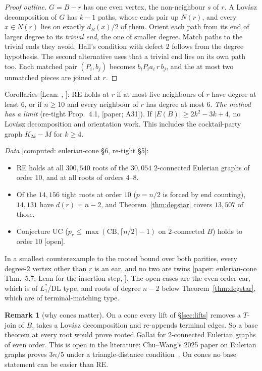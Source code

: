 \documentclass[11pt]{amsart}
\theoremstyle{definition}
\newtheorem{remark}[theorem]{Remark}
\newcommand{\st}[1]{\textsf{\small[#1]}}
\begin{document}
\begin{proof}[Proof outline]
$G=B-r$ has one even vertex, the non-neighbour $s$ of $r$. A Lov\'asz decomposition of $G$ has $k-1$
paths, whose ends pair up $N(r)$, and every $x\in N(r)$ lies on exactly $d_B(x)/2$ of them. Orient each
path from its end of larger degree to its \emph{trivial end}, the one of smaller degree. Match paths to
the trivial ends they avoid. Hall's condition with defect $2$ follows from the degree hypothesis. The
second alternative uses that a trivial end lies on its own path too. Each matched pair $(P_i,b_j)$
becomes $b_iP_ia_i\,r\,b_j$, and the at most two unmatched pieces are joined at $r$.
\end{proof}

Corollaries \st{Lean: , \lean{rootedDecomp_of_deg_le_six}}: RE holds
at $r$ if at most five neighbours of $r$ have degree at least $6$, or if $n\ge10$ and every neighbour of
$r$ has degree at most $6$. \emph{The method has a limit} (re-tight Prop.~4.1, \st{paper; A31}). If
$|E(B)|\ge2k^2-3k+4$, no Lov\'asz decomposition and orientation work. This includes the cocktail-party
graph $K_{2k}-M$ for $k\ge4$.

\emph{Data} \st{computed: eulerian-cone \S6, re-tight \S5}:
\begin{itemize}[leftmargin=*]
\item RE holds at all $300{,}540$ roots of the $30{,}054$ $2$-connected Eulerian graphs of order $10$,
and at all roots of orders $4$--$8$.
\item Of the $14{,}156$ tight roots at order $10$ ($p=n/2$ is forced by end counting), $14{,}131$ have
$d(r)=n-2$, and Theorem~\ref{thm:degstar} covers $13{,}507$ of those.
\item Conjecture UC ($p_r\le\max(\mathrm{CB},\lceil n/2\rceil-1)$ on $2$-connected $B$) holds to order
$10$ \st{open}.
\end{itemize}
In a smallest counterexample to the rooted bound over both parities, every degree-$2$ vertex other than
$r$ is an ear, and no two are twins \st{paper: eulerian-cone Thm.~5.7; Lean for the insertion step,
\lean{PathDecomp.ear_insert}}. The open cases are the even-order ear, which is of $L_1^*$/DL type, and
roots of degree $n-2$ below Theorem~\ref{thm:degstar}, which are of terminal-matching type.

\begin{remark}[why cones matter]\label{rem:cones}
On a cone every lift of \S\ref{sec:lifts} removes a $T$-join of $B$, takes a Lov\'asz decomposition and
re-appends terminal edges. So a base theorem at every root would prove rooted Gallai for $2$-connected
Eulerian graphs of even order. This is open in the literature: Chu--Wang's 2025 paper on Eulerian
graphs proves $3n/5$ under a triangle-distance condition~\cite{CW}. On cones no base statement can be
easier than RE.
\end{remark}
\end{document}

